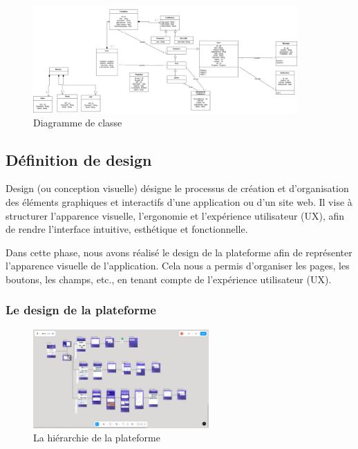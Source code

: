\documentclass{article}
\begin{document}
\begin{figure}[H]
  \centering
  \includegraphics[width=0.9\textwidth]{classe.png}
  \caption{Diagramme de classe}
\end{figure}






\subsection{Définition de design}
\hspace*{2em}Design (ou conception visuelle) désigne le processus de création et d’organisation des éléments graphiques et interactifs d’une application ou d’un site web. Il vise à structurer l’apparence visuelle, l’ergonomie et l’expérience utilisateur (UX), afin de rendre l’interface intuitive, esthétique et fonctionnelle.

\hspace{0,3cm}

\noindent Dans cette phase, nous avons réalisé le design de la plateforme afin de représenter l’apparence visuelle de l’application. Cela nous a permis d’organiser les pages, les boutons, les champs, etc., en tenant compte de l’expérience utilisateur (UX).
\subsubsection{Le design de la plateforme}
\begin{figure}[H]
  \centering
  \includegraphics[width=0.6\textwidth]{archifigma.PNG}
  \caption{La hiérarchie de la plateforme}
  \end{figure}
\end{document}
